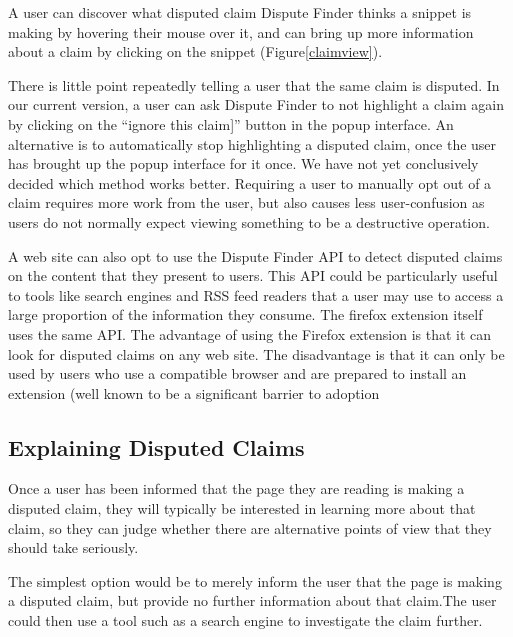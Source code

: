 \documentclass{www2010-submission}
\newcommand{\todo}[1]{}
\begin{document}
A user can discover what disputed claim Dispute Finder thinks a snippet is making by hovering their mouse over it, and can bring up more information about a claim by clicking on the snippet (Figure\ref{claimview}).

There is little point repeatedly telling a user that the same claim is disputed. In our current version, a user can ask Dispute Finder to not highlight a claim again by clicking on the ``ignore this claim]'' button in the popup interface. An alternative is to automatically stop highlighting a disputed claim, once the user has brought up the popup interface for it once. We have not yet conclusively decided which method works better. Requiring a user to manually opt out of a claim requires more work from the user, but also causes less user-confusion as users do not normally expect viewing something to be a destructive operation.

A web site can also opt to use the Dispute Finder API to detect disputed claims on the content that they present to users. This API could be particularly useful to tools like search engines and RSS feed readers that a user may use to access a large proportion of the information they consume. The firefox extension itself uses the same API. The advantage of using the Firefox extension is that it can look for disputed claims on any web site. The disadvantage is that it can only be used by users who use a compatible browser and are prepared to install an extension (well known to be a significant barrier to adoption\cite{extension-bad?}

\todo{Document API online}
\todo{Change the highlight color to yellow? Auto-adjust highlight color based on background color?}
\todo{Should we automatically adjust the highlight color, based on the background color of the page}
\todo{Discuss previous work on highlighting here, rather than in related work?}


\subsection{Explaining Disputed Claims}

Once a user has been informed that the page they are reading is making a disputed claim, they will typically be interested in learning more about that claim, so they can judge whether there are alternative points of view that they should take seriously.

The simplest option would be to merely inform the user that the page is making a disputed claim, but provide no further information about that claim.The user could then use a tool such as a search engine to investigate the claim further. 
\end{document}
